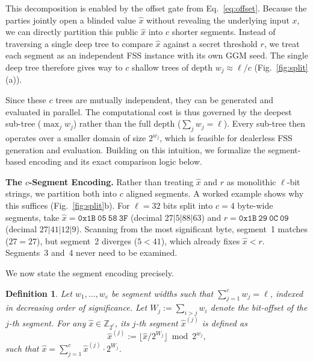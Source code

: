 \documentclass[journal]{IEEEtran}
\newtheorem{definition}{Definition}
\theoremstyle{definition}
\theoremstyle{plain}
\newcommand{\Z}{\mathbb{Z}}
\newcommand{\xhat}{\hat{x}}
\newcommand{\seg}[1]{^{\scriptscriptstyle(#1)}}   %
\newcommand{\nseg}{c}                              %
\newcommand{\wseg}{w}                              %
\begin{document}
This decomposition is enabled by the offset gate from Eq.~\eqref{eq:offset}. 
Because the parties jointly open a blinded value $\xhat$ without revealing the 
underlying input $x$, we can directly partition this public $\xhat$ into $\nseg$ shorter segments.
Instead of traversing a single deep tree to compare $\xhat$ against 
a secret threshold $r$, we treat each segment as an independent 
FSS instance with its own GGM seed. The single deep tree therefore gives way 
to $\nseg$ shallow trees of depth $\wseg_j\approx\ell/\nseg$ (Fig.~\ref{fig:split}(a)).

Since these $\nseg$ trees are mutually independent, they can be generated and
evaluated in parallel. The computational cost is thus governed by the deepest sub-tree ($\max_j\wseg_j$) rather than the full depth ($\sum_j\wseg_j=\ell$). 
Every sub-tree then operates over a smaller domain of size $2^{\wseg_j}$, which is feasible for dealerless FSS generation and evaluation.
Building on this intuition, we formalize the segment-based encoding and its exact comparison logic below.

\textbf{The $\nseg$-Segment Encoding.}
Rather than treating $\xhat$ and $r$ as monolithic $\ell$-bit strings, we partition both into $\nseg$ aligned segments. A worked example shows why this suffices (Fig.~\ref{fig:split}b).\label{ex:split}
For $\ell=32$ bits split into $\nseg=4$ byte-wide segments, take
$\xhat = \mathtt{0x1B~05~58~3F}$ (decimal $27|5|88|63$) and
$r = \mathtt{0x1B~29~0C~09}$ (decimal $27|41|12|9$).
Scanning from the most significant byte, segment~1 matches ($27=27$), 
but segment~2 diverges ($5<41$), which already fixes $\xhat<r$. 
Segments~3 and~4 never need to be examined. 

We now state the segment encoding precisely.

\begin{definition}\label{def:split}
Let $\wseg_1,\dots,\wseg_{\nseg}$ be segment widths such that 
$\sum_{j=1}^{\nseg}\wseg_j=\ell$, indexed in decreasing order of significance. 
Let $W_j:=\sum_{i>j}\wseg_i$ denote the bit-offset of the $j$-th segment. 
For any $\xhat\in\Z_{2^{\ell}}$, its $j$-th segment $\xhat\seg{j}$ is defined as
\begin{equation}
\xhat\seg{j}:=\big\lfloor \xhat/2^{W_j}\big\rfloor \bmod 2^{\wseg_j},
\end{equation}
such that $\xhat=\sum_{j=1}^{\nseg}\xhat\seg{j}\cdot 2^{W_j}$.
\end{definition}
\end{document}
